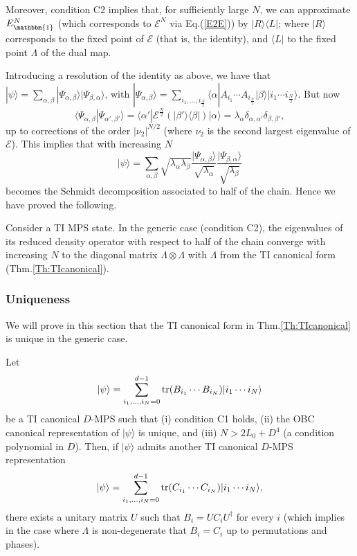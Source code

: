 \documentclass[aps,prl,epsfig,graphics,floatfix,mathbbm,a4paper]{article}
\newcommand{\E}{\mathcal{E}}
\newcommand{\1}{\mathbbm{1}}
\renewcommand{\>}{\rangle}
\newcommand{\<}{\langle}
\begin{document}
Moreover, condition C2 implies that,
for sufficiently large $N$, we can approximate $E_{\mathbbm{1}}^N$
(which corresponds to $\E^N$ via Eq.(\ref{E2E})) by $|R\>\<L|$;
where $|R\>$ corresponds to the fixed point of $\E$ (that is, the
identity), and $\<L|$ to the fixed point $\Lambda$ of the dual
map.

Introducing a resolution of the identity as above, we have that
$|\psi\>=\sum_{\alpha,\beta}|\Psi_{\alpha,\beta}\>|\Psi_{\beta,\alpha}\>$,
with $|\Psi_{\alpha,\beta}\>=\sum_{i_1,\ldots,i_{\frac{N}{2}}}
    \<\alpha|A_{i_1}\cdots A_{i_{\frac{N}{2}}}|\beta\>|i_1\cdots
    i_{\frac{N}{2}}\rangle$. But now
$$\<\Psi_{\alpha,\beta}|\Psi_{\alpha',\beta'}\>=
    \<\alpha'|\E^{\frac{N}{2}}(|\beta'\>\<\beta|)|\alpha\>=\lambda_{\alpha}\delta_{\alpha,\alpha'}\delta_{\beta,\beta'},$$
up to corrections of the order $|\nu_2|^{N/2}$ (where $\nu_2$ is
the second largest eigenvalue of $\E$). This implies that with
increasing $N$
$$|\psi\>=\sum_{\alpha,\beta}\sqrt{\lambda_\alpha \lambda_\beta}
    \frac{|\Psi_{\alpha,\beta}\>}{\sqrt{\lambda_\alpha}}\frac{|\Psi_{\beta,\alpha}\>}{\sqrt{\lambda_\beta}}$$
becomes the Schmidt decomposition associated to half of the chain.
Hence we have proved the following.

\begin{theorem}
    Consider a TI MPS state. In the generic case (condition C2), the
    eigenvalues of its reduced density operator with respect to half
    of the chain converge with increasing $N$ to the diagonal matrix
    $\Lambda\otimes \Lambda$ with $\Lambda$ from the TI canonical form
    (Thm.\ref{Th:TIcanonical}).
\end{theorem}



\subsubsection{Uniqueness}

We will prove in this section that the TI canonical form in
Thm.\ref{Th:TIcanonical} is unique in the generic case.

\begin{theorem}\label{thm-uniq}

    Let $$|\psi\>=\sum_{i_1,\ldots,i_N=0}^{d-1} \trace(B_{i_1}\cdots
        B_{i_N})|i_1\cdots i_N\>$$ be a TI canonical $D$-MPS such that (i)
    condition C1 holds, (ii) the OBC canonical representation of
    $|\psi\>$ is unique, and (iii) $N>2L_0+D^4$ (a condition
    polynomial in $D$). Then, if $|\psi\>$ admits another TI canonical
    $D$-MPS representation
    $$|\psi\>=\sum_{i_1,\ldots,i_N=0}^{d-1} \trace(C_{i_1}\cdots
        C_{i_N})|i_1\cdots i_N\>,$$ there exists a unitary matrix $U$ such
    that $B_i=UC_iU^{\dagger}$ for every $i$ (which implies in the
    case where $\Lambda$ is non-degenerate that $B_i=C_i$ up to
    permutations and phases).
\end{theorem}
\end{document}
